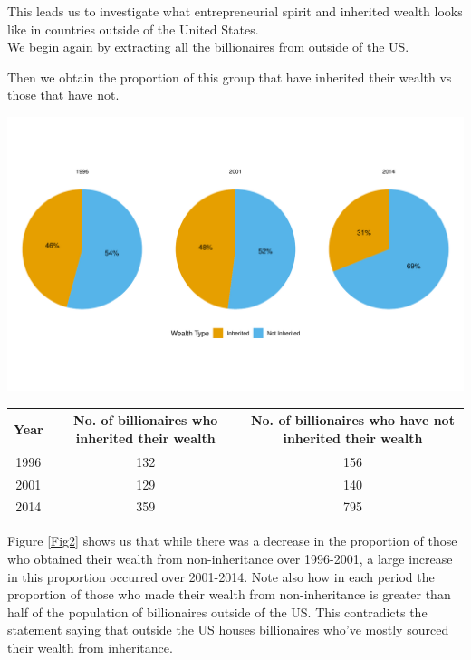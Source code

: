 \documentclass[11pt,preprint]{elsarticle}
\let\origfigure\figure
\let\endorigfigure\endfigure
\renewenvironment{figure}[1][2] {
    \expandafter\origfigure\expandafter[H]
} {
    \endorigfigure
}
\let\origtable\table
\let\endorigtable\endtable
\renewenvironment{table}[1][2] {
    \expandafter\origtable\expandafter[H]
} {
    \endorigtable
}
\numberwithin{equation}{section}
\numberwithin{figure}{section}
\numberwithin{table}{section}
\begin{document}
This leads us to investigate what entrepreneurial spirit and inherited
wealth looks like in countries outside of the United States.\\
We begin again by extracting all the billionaires from outside of the
US.

Then we obtain the proportion of this group that have inherited their
wealth vs those that have not.

\begin{figure}[H]

{\centering \includegraphics[width=0.8\linewidth]{./output/fig2} 

}

\caption{Pie chart showing proportions of those outside of the US billionaires that had inherited vs those that did not inherit their wealth \label{Fig2}}\label{fig:unnamed-chunk-3}
\end{figure}

\begin{table}
\centering
\caption{\label{tab:Outside US inheritance table}Table showing Outside of the US inheritance statistics \label{tab2}}
\centering
\begin{tabular}[t]{c|c|c}
\hline
Year & No. of billionaires who inherited their wealth & No. of billionaires who have not inherited their wealth\\
\hline
1996 & 132 & 156\\
\hline
2001 & 129 & 140\\
\hline
2014 & 359 & 795\\
\hline
\end{tabular}
\end{table}

Figure \ref{Fig2} shows us that while there was a decrease in the
proportion of those who obtained their wealth from non-inheritance over
1996-2001, a large increase in this proportion occurred over 2001-2014.
Note also how in each period the proportion of those who made their
wealth from non-inheritance is greater than half of the population of
billionaires outside of the US. This contradicts the statement saying
that outside the US houses billionaires who've mostly sourced their
wealth from inheritance.
\end{document}
